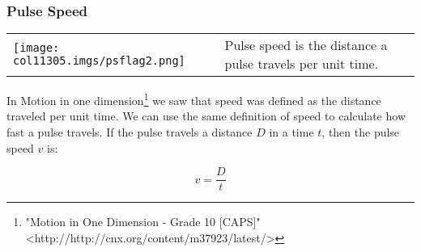             \subsubsection{ Pulse Speed}
            \nopagebreak
\par
            \label{m38801*fhsst!!!underscore!!!id145}\begin{definition}
	  \begin{tabular*}{15 cm}{m{15 mm}m{}}
	\hspace*{-50pt}  \texttt{[image: col11305.imgs/psflag2.png]}   & \Definition{   \label{id2435275}\textbf{ Pulse Speed }} { \label{m38801*meaningfhsst!!!underscore!!!id145}
        \label{m38801*id313292}Pulse speed is the distance a pulse travels per unit time. \par 
         } 
      \end{tabular*}
      \end{definition}
        \label{m38801*id313303}In Motion in one dimension\footnote{\raggedright{}"Motion in One Dimension - Grade 10 [CAPS]" <http://http://cnx.org/content/m37923/latest/>} we saw that speed was defined as the distance traveled per unit time. We can use the same definition of speed to calculate how fast a pulse travels. If the pulse travels a distance $D$ in a time $t$, then the pulse speed $v$ is:\par 
        \label{m38801*uid4}\nopagebreak\noindent{}
    \begin{equation}
    v=\frac{D}{t}\tag{6.1}
      \end{equation}
\par
            \label{m38801*secfhsst!!!underscore!!!id161}\vspace{.5cm} 
      \noindent
